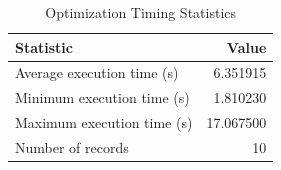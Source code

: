 
\begin{table}[h!]
\centering
\begin{tabular}{l r}
\hline
Statistic & Value \\
\hline
Average execution time (s) & 6.351915 \\
Minimum execution time (s) & 1.810230 \\
Maximum execution time (s) & 17.067500 \\
Number of records & 10 \\
\hline
\end{tabular}
\caption{Optimization Timing Statistics}
\end{table}
